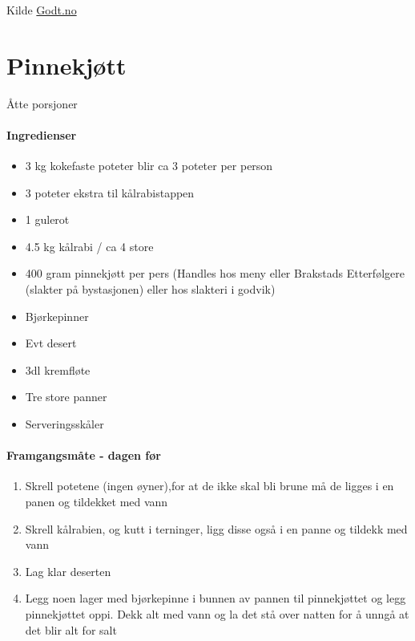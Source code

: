 \documentclass[12pt,a4paper]{book}
\begin{document}
{Kilde \href{http://www.godt.no/o2055}{Godt.no}
\clearpage{}
\clearpage{}\section{﻿Pinnekjøtt}
Åtte porsjoner

\paragraph{Ingredienser}
\begin{itemize}[noitemsep]
	\item 3 kg kokefaste poteter blir ca 3 poteter per person
	\item 3 poteter ekstra til kålrabistappen
	\item 1 gulerot
	\item 4.5 kg kålrabi / ca 4 store
	\item 400 gram pinnekjøtt per pers (Handles hos meny eller Brakstads Etterfølgere (slakter på bystasjonen) eller hos slakteri i godvik)
	\item Bjørkepinner
	\item Evt desert
	\item 3dl kremfløte
	\item Tre store panner
	\item Serveringsskåler
\end{itemize}

\paragraph{Framgangsmåte - dagen før}
\begin{enumerate}[noitemsep]
	\item Skrell potetene (ingen øyner),for at de ikke skal bli brune må de ligges i en panen og tildekket med vann
	\item Skrell kålrabien, og kutt i terninger, ligg disse også i en panne og tildekk med vann
	\item Lag klar deserten
	\item Legg noen lager med bjørkepinne i bunnen av pannen til pinnekjøttet og legg pinnekjøttet oppi. Dekk alt med vann og la det stå over natten for å unngå at det blir alt for salt
\end{enumerate}

}
\end{document}
